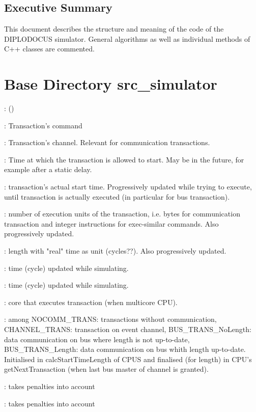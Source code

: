 \documentclass[a4paper,11pt]{article}
\newcommand{\bfont}{\fontseries{b}\selectfont}
\newcommand{\cod}[1]{{\ttfamily #1}}
\newcommand{\class}[2]{\par\vspace{1mm}\hspace{-5mm}\large\colorbox{file}{\textbullet\bfont\cod{#1}:} (\cod{#2})\par}
\newcommand{\method}[1]{\par\vspace{1mm}\hspace{-2mm}\colorbox{method}{\textopenbullet\bfont\cod{#1}:}}
\newcommand{\variable}[1]{\par\vspace{1mm}\hspace{-2mm}\colorbox{variable}{\textopenbullet\bfont\cod{#1}:}}
\begin{document}
\subsection{Executive Summary}

This document describes the structure and meaning of the code of the DIPLODOCUS simulator. General algorithms as well as individual methods of C++ classes are commented.

\newpage 

\section*{Base Directory \cod{src\_simulator}}
\class{Transaction}{}
\variable{\_command} Transaction's command
\variable{\_channel} Transaction's channel. Relevant for communication transactions.
\variable{\_runnableTime} Time at which the transaction is allowed to start. May be in the future, for example after a static delay.
\variable{\_startTime} transaction's actual start time. Progressively updated while trying to execute, until transaction is actually executed (in particular for bus transaction).
\variable{\_virtualLength} number of execution units of the transaction, i.e. bytes for communication transaction and integer instructions for exec-similar commands. Also progressively updated.
\variable{\_length} length with "real" time as unit (cycles??). Also progressively updated.
\variable{\_idlePenalty} time (cycle) updated while simulating.
\variable{\_taskSwitchingPenalty} time (cycle) updated while simulating.
\variable{\_transactCoreNumber} core that executes transaction (when multicore CPU).
\variable{\_transType} among \cod{NOCOMM\_TRANS}: transactions without communication, \cod{CHANNEL\_TRANS}: transaction on event channel, \cod{BUS\_TRANS\_NoLength}: data communication on bus where length is not up-to-date, \cod{BUS\_TRANS\_Length}: data communication on bus whith length up-to-date. Initialised in \cod{calcStartTimeLength} of CPUS and finalised (for length) in CPU's \cod{getNextTransaction} (when last bus master of channel is granted).
\method{getStartTimeOperation()} takes penalties into account
\method{getEndTime()} takes penalties into account
\end{document}
